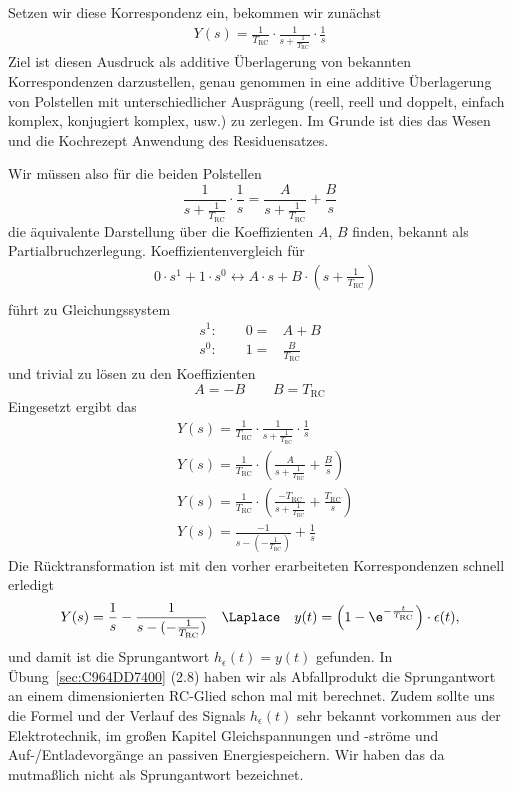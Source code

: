 \begin{Loesung}
\begin{itemize}
Setzen wir diese Korrespondenz ein, bekommen wir zunächst
\begin{align}
Y(s) = \frac{1}{T_\mathrm{RC}}\cdot\frac{1}{s + \frac{1}{T_\mathrm{RC}}} \cdot \frac{1}{s}
\end{align}
Ziel ist diesen Ausdruck als additive Überlagerung von bekannten Korrespondenzen
darzustellen, genau genommen in eine additive Überlagerung von Polstellen mit
unterschiedlicher Ausprägung
(reell, reell und doppelt, einfach komplex, konjugiert komplex, usw.) zu zerlegen.
Im Grunde ist dies das Wesen und die Kochrezept Anwendung des Residuensatzes.

Wir müssen also für die beiden Polstellen
\begin{equation}
\frac{1}{s + \frac{1}{T_\mathrm{RC}}} \cdot \frac{1}{s} =
\frac{A}{s + \frac{1}{T_\mathrm{RC}}} + \frac{B}{s}
\end{equation}
die äquivalente Darstellung über die Koeffizienten $A$, $B$ finden, bekannt als
Partialbruchzerlegung.
Koeffizientenvergleich für
\begin{align}
&0\cdot s^1 + 1\cdot s^0 \leftrightarrow
A\cdot s + B \cdot (s + \frac{1}{T_\mathrm{RC}})\\
\end{align}
führt zu Gleichungssystem
\begin{align}
s^1: \qquad 0 =& A + B\\
s^0: \qquad 1 =& \frac{B}{T_\mathrm{RC}}
\end{align}
und trivial zu lösen zu den Koeffizienten
\begin{equation}
  A=-B\qquad B = T_\mathrm{RC}
\end{equation}
Eingesetzt ergibt das
\begin{align}
&Y(s) = \frac{1}{T_\mathrm{RC}}\cdot\frac{1}{s + \frac{1}{T_\mathrm{RC}}} \cdot \frac{1}{s}\\
&Y(s) = \frac{1}{T_\mathrm{RC}}\cdot \left(\frac{A}{s + \frac{1}{T_\mathrm{RC}}} + \frac{B}{s}\right)\\
&Y(s) = \frac{1}{T_\mathrm{RC}}\cdot \left(\frac{-T_\mathrm{RC}}{s + \frac{1}{T_\mathrm{RC}}} + \frac{T_\mathrm{RC}}{s}\right)\\
&Y(s) = \frac{-1}{s - (-\frac{1}{T_\mathrm{RC}})} + \frac{1}{s}
\end{align}
Die Rücktransformation ist mit den vorher erarbeiteten Korrespondenzen schnell
erledigt
\begin{align}
Y(s) = \frac{1}{s} - \frac{1}{s - (-\frac{1}{T_\mathrm{RC}})} \quad \Laplace \quad
y(t) = \left(1-\e^{-\frac{t}{T_\mathrm{RC}}}\right)\cdot \epsilon(t),
\end{align}
und damit ist die Sprungantwort $h_\epsilon(t) = y(t)$ gefunden.
In Übung~\ref{sec:C964DD7400} (2.8) haben wir als Abfallprodukt die Sprungantwort an einem dimensionierten
RC-Glied schon mal mit berechnet. Zudem sollte uns die Formel und der Verlauf des
Signals $h_\epsilon(t)$ sehr bekannt vorkommen aus der Elektrotechnik,
im großen Kapitel Gleichspannungen und -ströme und Auf-/Entladevorgänge
an passiven Energiespeichern. Wir haben das
da mutmaßlich nicht als Sprungantwort bezeichnet.



\end{itemize}
\end{Loesung}
